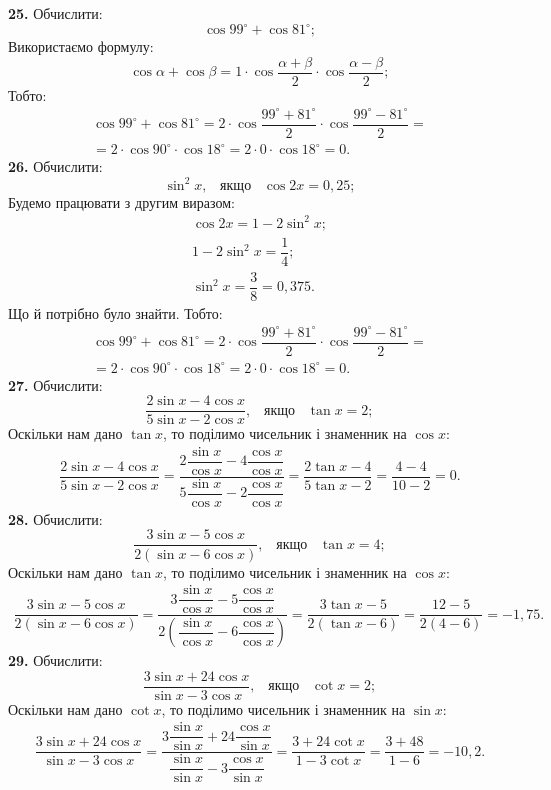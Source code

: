 \textbf{25.} Обчислити:
$$
\cos99^\circ+\cos81^\circ;
$$
Використаємо формулу:
$$
\cos\alpha+\cos\beta=1\cdot\cos\dfrac{\alpha+\beta}{2}\cdot\cos\dfrac{\alpha-\beta}{2};
$$
Тобто:
\begin{multline*}
\cos99^\circ+\cos81^\circ=
2\cdot\cos\dfrac{99^\circ+81^\circ}{2}\cdot\cos\dfrac{99^\circ-81^\circ}{2}=\\
=2\cdot\cos90^\circ\cdot\cos18^\circ=2\cdot0\cdot\cos18^\circ=0.
\end{multline*}
\textbf{26.} Обчислити:
$$
\sin^{2}x, \;\;\; \mbox{якщо} \;\;\; \cos2x=0,25;
$$
Будемо працювати з другим виразом:
\begin{gather*}
\cos2x=1-2\sin^{2}x;\\
1-2\sin^{2}x=\dfrac{1}{4};\\
\sin^{2}x=\dfrac{3}{8}=0,375.
\end{gather*}
Що й потрібно було знайти.
Тобто:
\begin{multline*}
\cos99^\circ+\cos81^\circ=
2\cdot\cos\dfrac{99^\circ+81^\circ}{2}\cdot\cos\dfrac{99^\circ-81^\circ}{2}=\\
=2\cdot\cos90^\circ\cdot\cos18^\circ=2\cdot0\cdot\cos18^\circ=0.
\end{multline*}
\textbf{27.} Обчислити:
$$
\dfrac{2\sin{x}-4\cos{x}}{5\sin{x}-2\cos{x}}, \;\;\; \mbox{якщо} \;\;\; \tan{x}=2;
$$
Оскільки нам дано $\tan{x}$, то поділимо чисельник і знаменник на $\cos{x}$:
\begin{gather*}
\dfrac{2\sin{x}-4\cos{x}}{5\sin{x}-2\cos{x}}=
\dfrac{2\dfrac{\sin{x}}{\cos{x}}-4\dfrac{\cos{x}}{\cos{x}}}
{5\dfrac{\sin{x}}{\cos{x}}-2\dfrac{\cos{x}}{\cos{x}}}=
\dfrac{2\tan{x}-4}{5\tan{x}-2}=\dfrac{4-4}{10-2}=0.
\end{gather*}
\textbf{28.} Обчислити:
$$
\dfrac{3\sin{x}-5\cos{x}}{2(\sin{x}-6\cos{x})}, \;\;\; \mbox{якщо} \;\;\; \tan{x}=4;
$$
Оскільки нам дано $\tan{x}$, то поділимо чисельник і знаменник на $\cos{x}$:
\begin{gather*}
\dfrac{3\sin{x}-5\cos{x}}{2(\sin{x}-6\cos{x})}=
\dfrac{3\dfrac{\sin{x}}{\cos{x}}-5\dfrac{\cos{x}}{\cos{x}}}
{2(\dfrac{\sin{x}}{\cos{x}}-6\dfrac{\cos{x}}{\cos{x}})}=
\dfrac{3\tan{x}-5}{2(\tan{x}-6)}=\dfrac{12-5}{2(4-6)}=-1,75.
\end{gather*}
\textbf{29.} Обчислити:
$$
\dfrac{3\sin{x}+24\cos{x}}{\sin{x}-3\cos{x}}, \;\;\; \mbox{якщо} \;\;\; \cot{x}=2;
$$
Оскільки нам дано $\cot{x}$, то поділимо чисельник і знаменник на $\sin{x}$:
\begin{gather*}
\dfrac{3\sin{x}+24\cos{x}}{\sin{x}-3\cos{x}}=
\dfrac{3\dfrac{\sin{x}}{\sin{x}}+24\dfrac{\cos{x}}{\sin{x}}}
{\dfrac{\sin{x}}{\sin{x}}-3\dfrac{\cos{x}}{\sin{x}}}=
\dfrac{3+24\cot{x}}{1-3\cot{x}}=\dfrac{3+48}{1-6}=-10,2.
\end{gather*}
